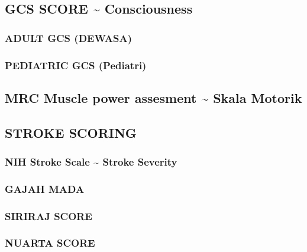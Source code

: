 \documentclass[
]{book}
\begin{document}
\hypertarget{gcs-score-consciousness}{%
\subsection{GCS SCORE \textasciitilde{} Consciousness}\label{gcs-score-consciousness}}

\hypertarget{adult-gcs-dewasa}{%
\subsubsection{ADULT GCS (DEWASA)}\label{adult-gcs-dewasa}}

\hypertarget{pediatric-gcs-pediatri}{%
\subsubsection{PEDIATRIC GCS (Pediatri)}\label{pediatric-gcs-pediatri}}

\hypertarget{mrc-muscle-power-assesment-skala-motorik}{%
\subsection{MRC Muscle power assesment \textasciitilde{} Skala Motorik}\label{mrc-muscle-power-assesment-skala-motorik}}

\hypertarget{stroke-scoring}{%
\subsection{STROKE SCORING}\label{stroke-scoring}}

\hypertarget{nih-stroke-scale-stroke-severity}{%
\subsubsection{NIH Stroke Scale \textasciitilde{} Stroke Severity}\label{nih-stroke-scale-stroke-severity}}

\hypertarget{gajah-mada}{%
\subsubsection{GAJAH MADA}\label{gajah-mada}}

\hypertarget{siriraj-score}{%
\subsubsection{SIRIRAJ SCORE}\label{siriraj-score}}

\hypertarget{nuarta-score}{%
\subsubsection{NUARTA SCORE}\label{nuarta-score}}
\end{document}
